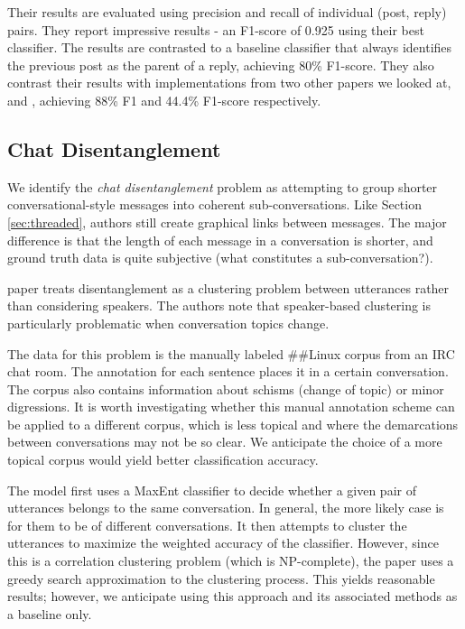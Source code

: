 \documentclass[11pt]{article}
\begin{document}
Their results are evaluated using precision and recall of individual
(post, reply) pairs. They report impressive results - an F1-score of 0.925 using their best
classifier. The results are contrasted to a baseline classifier that always
identifies the previous post as the parent of a reply, achieving 80\% F1-score. 
They also contrast their results with implementations from two other papers we looked at,
\cite{Elsner2008a} and \cite{Wang2008a}, achieving 88\% F1 and 44.4\% F1-score
respectively.

\subsection{Chat Disentanglement}
\label{sec:chat}
We identify the \textit{chat disentanglement} problem as attempting to group
shorter conversational-style messages into coherent sub-conversations. Like 
Section \ref{sec:threaded}, authors still create graphical links between messages. The major
difference is that the length of each message in a conversation is shorter, and ground truth
data is quite subjective (what constitutes a sub-conversation?).

\cite{Elsner2008a}  paper treats disentanglement as a clustering problem between 
utterances rather than considering speakers. The authors note that speaker-based clustering is
particularly problematic when conversation topics change.

The data for this problem is the manually labeled \#\#Linux corpus from an IRC
chat room. The annotation for each sentence places it in a certain conversation.
The corpus also contains information about schisms (change of topic) or minor
digressions. It is worth investigating whether this manual annotation scheme can
be applied to a different corpus, which is less topical and where the
demarcations between conversations may not be so clear. We anticipate the choice
of a more topical corpus would yield better classification accuracy.

The model first uses a MaxEnt classifier to decide whether a given pair of
utterances belongs to the same conversation. In general, the more likely case is
for them to be of different conversations. It then attempts to cluster the
utterances to maximize the weighted accuracy of the classifier. However, since
this is a correlation clustering problem (which is NP-complete), the paper uses
a greedy search approximation to the clustering process. This yields reasonable
results; however, we anticipate using this approach and its associated methods
as a baseline only.
\end{document}
